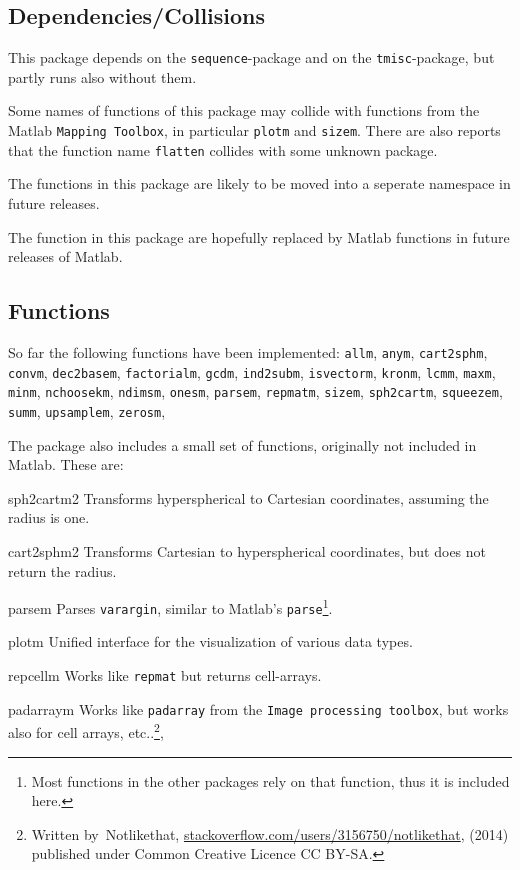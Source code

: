\subsection*{Dependencies/Collisions}
This package depends on the \texttt{sequence}-package and on the \texttt{tmisc}-package, but partly runs also without them.

{\color{red}
Some names of functions of this package may collide with functions from the
Matlab \texttt{Mapping Toolbox}, in particular \texttt{plotm} and \texttt{sizem}.
There are also reports that the function name \texttt{flatten} collides with some unknown package.}

The functions in this package are likely to be moved into a seperate namespace in future releases.

The function in this package are hopefully replaced by Matlab functions in future releases of Matlab.

\subsection*{Functions}
So far the following functions have been implemented:
\texttt{allm},  
\texttt{anym},  
\texttt{cart2sphm},
\texttt{convm},  
\texttt{dec2basem},  
\texttt{factorialm},  
\texttt{gcdm},  
\texttt{ind2subm},  
\texttt{isvectorm},  
\texttt{kronm},  
\texttt{lcmm},  
\texttt{maxm},  
\texttt{minm},  
\texttt{nchoosekm},
\texttt{ndimsm},  
\texttt{onesm}, 
\texttt{parsem}, 
\texttt{repmatm}, 
\texttt{sizem},  
\texttt{sph2cartm},  
\texttt{squeezem},
\texttt{summ},  
\texttt{upsamplem},  
\texttt{zerosm},  


The package also includes a small set of functions, originally not included in Matlab. These are:
\begin{param}
\item[sph2cartm2] Transforms hyperspherical to Cartesian coordinates, assuming the radius is one.
\item[cart2sphm2]Transforms Cartesian to hyperspherical coordinates, but does not return the radius.
\item[parsem] Parses \texttt{varargin}, similar to Matlab's \texttt{parse}\footnote{Most functions in the other packages rely on that function, thus it is included here.}.
\item[plotm] Unified interface for the visualization of various data types.
\item[repcellm] Works like \texttt{repmat} but returns cell-arrays.
\item[padarraym] Works like \texttt{padarray} from the \texttt{Image processing toolbox}, but works also for cell arrays, etc..\footnote{Written by~Notlikethat, \href{stackoverflow.com/users/3156750/notlikethat}{stackoverflow.com/users/3156750/notlikethat}, (2014) published under Common Creative Licence CC BY-SA.},
\end{param}




